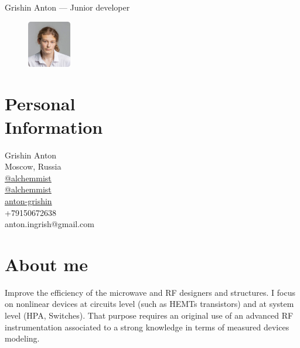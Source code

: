 \documentclass[margin,line]{resume}
\begin{document}
{\sc \Large Grishin Anton --- Junior developer \\}

\begin{resume}


  \begin{figure}
    \vspace{-0.9cm}
    \begin{center}
      \includegraphics[width=0.17\textwidth]{avatar.png}
    \end{center}
    \vspace{-1cm}
  \end{figure}


  \section{\mysidestyle Personal\\Information}
  Grishin Anton \\
  Moscow, Russia \\
  \faGithub  \space \href{https://github.com/alchemmist/}{@alchemmist} \\
  \faPaperPlane \space \href{https://t.me/alchemmist}{@alchemmist} \\
  \faLinkedin \space
  \href{https://www.linkedin.com/in/anton-grishin-6966a8362/}{anton-grishin} \\
  \faPhone \space +79150672638 \\
  \faEnvelope \space anton.ingrish@gmail.com \\


  \section{\mysidestyle About me}
  Improve the efficiency of the microwave and RF designers and
  structures. I focus on nonlinear devices at circuits level (such as
  HEMTs transistors) and at system level (HPA, Switches). That
  purpose requires an original use of an advanced RF instrumentation
  associated to a strong knowledge in terms of measured devices modeling.


\end{resume}
\end{document}
